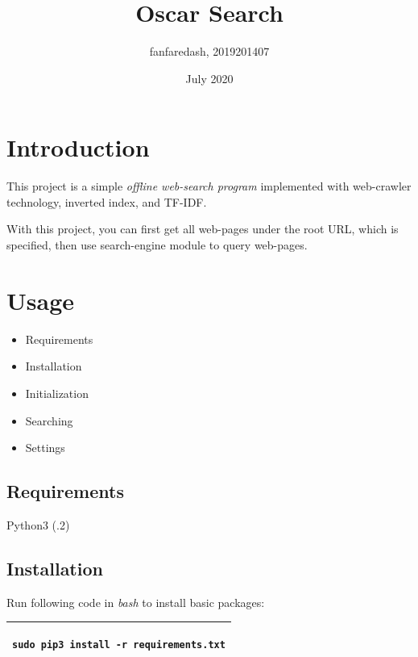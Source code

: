 \documentclass{article}
\title{Oscar Search}
\author{fanfaredash, 2019201407}
\date{July 2020}
\begin{document}
\maketitle

\section{Introduction}

This project is a simple \emph{offline web-search program} implemented with web-crawler technology, inverted index, and TF-IDF.

With this project, you can first get all web-pages under the root URL, which is specified, then use search-engine module to query web-pages.

\section{Usage}

\begin{itemize}
    \item Requirements
    \item Installation
    \item Initialization
    \item Searching
    \item Settings
\end{itemize}

\subsection{Requirements}
Python3 (.2)
\\

\subsection{Installation}
Run following code in \emph{bash} to install basic packages:\\

\begin{tabular}{|l|}\hline\begin{minipage}[t][1em]{20em}\begin{verbatim}
sudo pip3 install -r requirements.txt
\end{verbatim}\end{minipage}\\\hline\end{tabular}
\\
\end{document}
